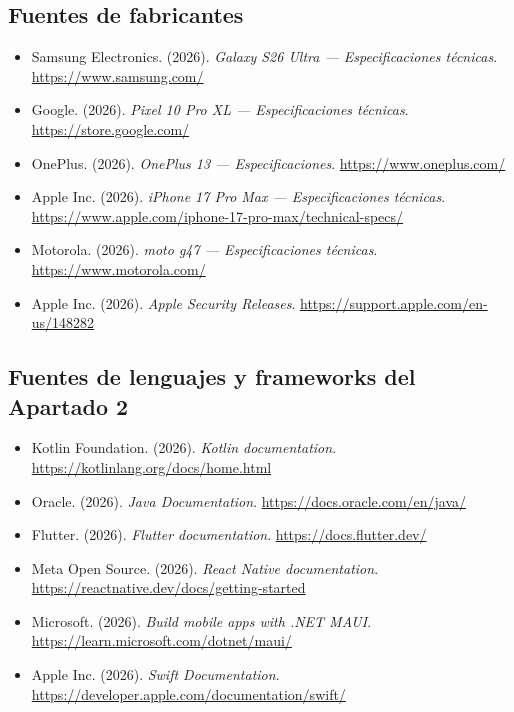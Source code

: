 \subsection*{Fuentes de fabricantes}
{\small
\begin{itemize}[leftmargin=*,itemsep=0.1em,label={}]
  \item Samsung Electronics. (2026). \emph{Galaxy S26 Ultra --- Especificaciones técnicas}. \url{https://www.samsung.com/}
  \item Google. (2026). \emph{Pixel 10 Pro XL --- Especificaciones técnicas}. \url{https://store.google.com/}
  \item OnePlus. (2026). \emph{OnePlus 13 --- Especificaciones}. \url{https://www.oneplus.com/}
  \item Apple Inc. (2026). \emph{iPhone 17 Pro Max --- Especificaciones técnicas}. \url{https://www.apple.com/iphone-17-pro-max/technical-specs/}
  \item Motorola. (2026). \emph{moto g47 --- Especificaciones técnicas}. \url{https://www.motorola.com/}
  \item Apple Inc. (2026). \emph{Apple Security Releases}. \url{https://support.apple.com/en-us/148282}
\end{itemize}
}

\subsection*{Fuentes de lenguajes y frameworks del Apartado 2}
{\small
\begin{itemize}[leftmargin=*,itemsep=0.1em,label={}]
  \item Kotlin Foundation. (2026). \emph{Kotlin documentation}. \url{https://kotlinlang.org/docs/home.html}
  \item Oracle. (2026). \emph{Java Documentation}. \url{https://docs.oracle.com/en/java/}
  \item Flutter. (2026). \emph{Flutter documentation}. \url{https://docs.flutter.dev/}
  \item Meta Open Source. (2026). \emph{React Native documentation}. \url{https://reactnative.dev/docs/getting-started}
  \item Microsoft. (2026). \emph{Build mobile apps with .NET MAUI}. \url{https://learn.microsoft.com/dotnet/maui/}
  \item Apple Inc. (2026). \emph{Swift Documentation}. \url{https://developer.apple.com/documentation/swift/}
\end{itemize}
}

